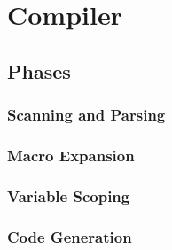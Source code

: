 \chapter{Compiler}
\label{chap:Compiler}

\section{Phases}

\subsection{Scanning and Parsing}

\subsection{Macro Expansion}

\subsection{Variable Scoping}

\subsection{Code Generation}

